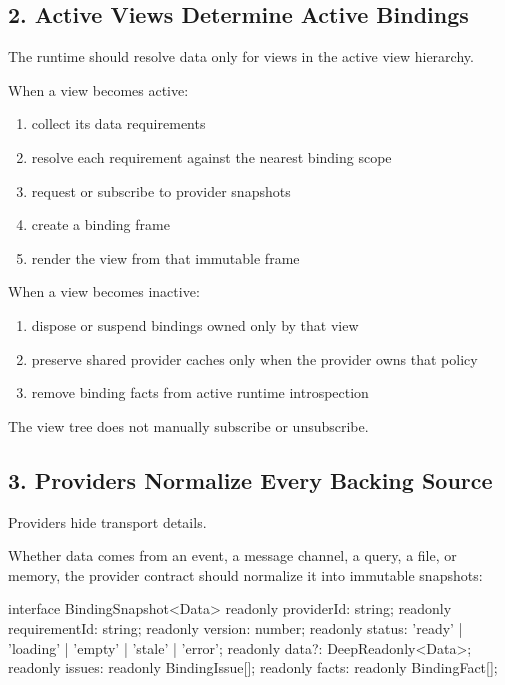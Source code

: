 \subsection{2. Active Views Determine Active Bindings}\label{record-132-active-views-determine-active-bindings}

The runtime should resolve data only for views in the active view hierarchy.

When a view becomes active:

\begin{enumerate}
\def\labelenumi{\arabic{enumi}.}
\tightlist
\item
  collect its data requirements
\item
  resolve each requirement against the nearest binding scope
\item
  request or subscribe to provider snapshots
\item
  create a binding frame
\item
  render the view from that immutable frame
\end{enumerate}

When a view becomes inactive:

\begin{enumerate}
\def\labelenumi{\arabic{enumi}.}
\tightlist
\item
  dispose or suspend bindings owned only by that view
\item
  preserve shared provider caches only when the provider owns that policy
\item
  remove binding facts from active runtime introspection
\end{enumerate}

The view tree does not manually subscribe or unsubscribe.

\subsection{3. Providers Normalize Every Backing Source}\label{record-132-providers-normalize-every-backing-source}

Providers hide transport details.

Whether data comes from an event, a message channel, a query, a file, or memory, the provider contract should normalize it into immutable snapshots:

\begin{CodeBlock}
interface BindingSnapshot<Data> {
  readonly providerId: string;
  readonly requirementId: string;
  readonly version: number;
  readonly status: 'ready' | 'loading' | 'empty' | 'stale' | 'error';
  readonly data?: DeepReadonly<Data>;
  readonly issues: readonly BindingIssue[];
  readonly facts: readonly BindingFact[];
}
\end{CodeBlock}

